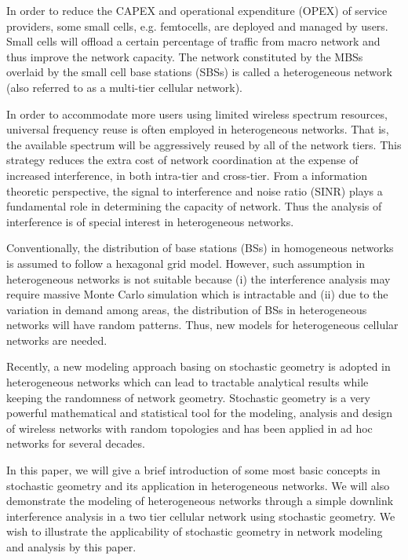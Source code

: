\documentclass[a4paper,twocolumn]{IEEEtran}
\begin{document}
In order to reduce the CAPEX and operational expenditure (OPEX) of service providers, some small cells, e.g. femtocells, are deployed and managed by users. Small cells will offload a certain percentage of traffic from macro network and thus improve the network capacity. The network constituted by the MBSs overlaid by the small cell base stations (SBSs) is called a heterogeneous network (also referred to as a multi-tier cellular network).

In order to accommodate more users using limited wireless spectrum resources, universal frequency reuse is often employed in heterogeneous networks\cite{Lin2011, Andrews2012JSAC}. That is, the available spectrum will be aggressively reused by all of the network tiers. This strategy reduces the extra cost of network coordination at the expense of increased interference, in both intra-tier and cross-tier. From a information theoretic perspective, the signal to interference and noise ratio (SINR) plays a fundamental role in determining the capacity of network. Thus the analysis of interference is of special interest in heterogeneous networks.

Conventionally, the distribution of base stations (BSs) in homogeneous networks is assumed to follow a hexagonal grid model. However, such assumption in heterogeneous networks is not suitable because (i) the interference analysis may require massive Monte Carlo simulation\cite{Gilhousen1991} which is intractable and (ii) due to the variation in demand among areas, the distribution of BSs in heterogeneous networks will have random patterns. Thus, new models for heterogeneous cellular networks are needed.

Recently, a new modeling approach basing on stochastic geometry is adopted in heterogeneous networks which can lead to tractable analytical results while keeping the randomness of network geometry. Stochastic geometry is a very powerful mathematical and statistical tool for the modeling, analysis and design of wireless networks with random topologies and has been applied in ad hoc networks for several decades\cite{Haenggi2013Book, Haenggi2009JSAC, Baccelli2009Vol1, Baccelli2009Vol2, Cardieri2010}.

In this paper, we will give a brief introduction of some most basic concepts in stochastic geometry and its application in heterogeneous networks. We will also demonstrate the modeling of heterogeneous networks through a simple downlink interference analysis in a two tier cellular network using stochastic geometry. We wish to illustrate the applicability of stochastic geometry in network modeling and analysis by this paper.
\end{document}
